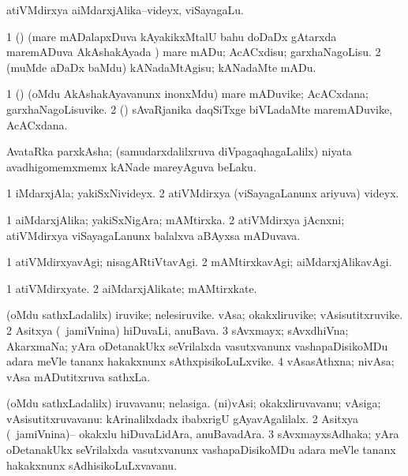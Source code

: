 \noindent
\gl{\pagu}
\bmng
{} atiVMdirxya aiMdarxjAlika--videyx, viSayagaLu. 
\emng
\eentry

\bentry
{}
\gl{\sakirx}
\bmng
\bnum
\num{1} (\Kavi) (mare mADalapxDuva kAyakikxMtalU bahu doDaDx gAtarxda maremADuva AkAshakAyada \vi) mare mADu; AcACxdisu; garxhaNagoLisu. 
\num{2} (muMde aDaDx baMdu) kANadaMtAgisu; kANadaMte mADu. 
\enum
\emng
\eentry

\bentry
{}
\gl{\nA}
\bmng
\bnum
\num{1} (\Kavi) (oMdu AkAshakAyavanunx inonxMdu) mare mADuvike; AcACxdana; garxhaNagoLisuvike. 
\num{2} (\rUpa) sAvaRjanika daqSiTxge biVLadaMte maremADuvike, AcACxdana. 
\enum
\emng
\eentry

\bentry
{}
\gl{\nA}
\bmng
AvataRka parxkAsha; (samudarxdalilxruva diVpagaqhagaLalilx) niyata avadhigomemxmemx kANade mareyAguva beLaku. 
\emng
\eentry

\bentry
{}
\gl{\nA}
\bmng
\bnum
\num{1} iMdarxjAla; yakiSxNivideyx. 
\num{2} atiVMdirxya (viSayagaLanunx ariyuva) videyx. 
\enum
\emng
\eentry

\bentry
{}
\gl{\nA}
\bmng
\bnum
\num{1} aiMdarxjAlika; yakiSxNigAra; mAMtirxka. 
\num{2} atiVMdirxya jAcnxni; atiVMdirxya viSayagaLanunx balalxva aBAyxsa mADuvava. 
\enum
\emng
\eentry

\bentry
{}
\gl{\kirxvi}
\bmng
\bnum
\num{1} atiVMdirxyavAgi; nisagARtiVtavAgi. 
\num{2} mAMtirxkavAgi; aiMdarxjAlikavAgi. 
\enum
\emng
\eentry

\bentry
{}
\gl{\nA}
\bmng
\bnum
\num{1} atiVMdirxyate. 
\num{2} aiMdarxjAlikate; mAMtirxkate. 
\enum
\emng
\eentry

\bentry
{}
\gl{\nA}
\bmng
\bnum
{} (oMdu sathxLadalilx) 
\banum
{} iruvike; nelesiruvike. 
 vAsa; okakxliruvike; vAsisutitxruvike. 
\eanum
\numie
\num{2} Asitxya (\kanmu\ jamiVnina) hiDuvaLi, anuBava. 
\num{3} sAvxmayx; sAvxdhiVna; AkarxmaNa; yAra oDetanakUkx seVrilalxda vasutxvanunx vashapaDisikoMDu adara meVle tananx hakakxnunx sAthxpisikoLuLxvike. 
\num{4} vAsasAthxna; nivAsa; vAsa mADutitxruva sathxLa. 
\enum
\emng
\eentry

\bentry
{}
\gl{\gu}
\bmng
\bnum
{} (oMdu sathxLadalilx) 
\banum
{} iruvavanu; nelasiga. 
 (ni)vAsi; okakxliruvavanu; vAsiga; vAsisutitxruvavanu:  kArinalilxdadx ibabxrigU gAyavAgalilalx. 
\eanum
\numie
\num{2} Asitxya (\kanmu\ jamiVnina)-- okakxlu hiDuvaLidAra, anuBavadAra. 
\num{3} sAvxmayxsAdhaka; yAra oDetanakUkx seVrilalxda vasutxvanunx vashapaDisikoMDu adara meVle tananx hakakxnunx sAdhisikoLuLxvavanu. 
\enum
\emng
\eentry

